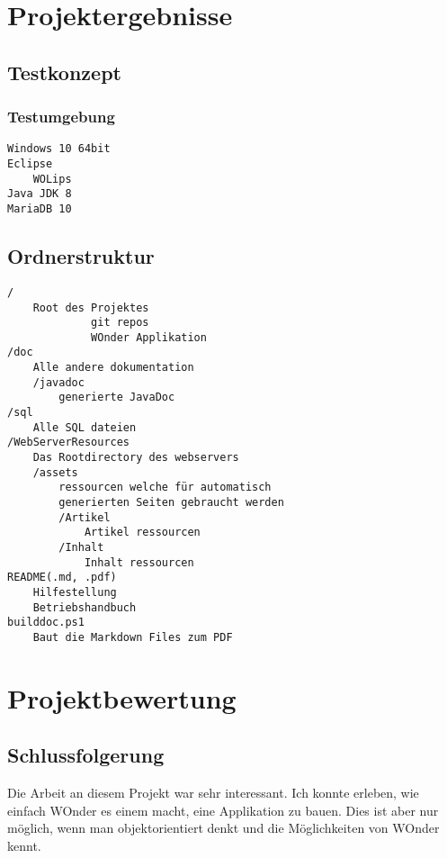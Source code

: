 \documentclass[a4paper, 11pt]{article}
\begin{document}
\section{Projektergebnisse}

\subsection{Testkonzept}

\subsubsection{Testumgebung}

\begin{verbatim}
Windows 10 64bit
Eclipse
    WOLips
Java JDK 8
MariaDB 10
\end{verbatim}


\clearpage
\subsection{Ordnerstruktur}

\begin{verbatim}
/
    Root des Projektes
             git repos
             WOnder Applikation
/doc
    Alle andere dokumentation
    /javadoc
        generierte JavaDoc
/sql
    Alle SQL dateien
/WebServerResources
    Das Rootdirectory des webservers
    /assets
        ressourcen welche für automatisch
        generierten Seiten gebraucht werden
        /Artikel
            Artikel ressourcen
        /Inhalt
            Inhalt ressourcen
README(.md, .pdf)
	Hilfestellung
	Betriebshandbuch
builddoc.ps1
	Baut die Markdown Files zum PDF
\end{verbatim}

\section{Projektbewertung}

\subsection{Schlussfolgerung}

Die Arbeit an diesem Projekt war sehr interessant. Ich konnte erleben, wie einfach WOnder es einem macht, eine Applikation zu bauen. Dies ist aber nur möglich, wenn man objektorientiert denkt und die Möglichkeiten von WOnder kennt.
\end{document}
